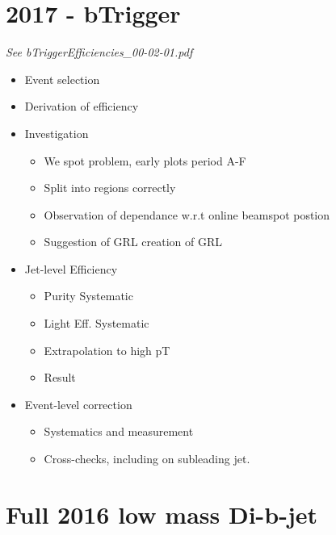 \section{2017 - bTrigger}
\textit{See bTriggerEfficiencies\_00-02-01.pdf}
\begin{itemize}
\item{Event selection}
\item{Derivation of efficiency}
\item{Investigation}
  \begin{itemize}[label={$-$}]
  \item{We spot problem, early plots period A-F}
  \item{Split into regions correctly}
  \item{Observation of dependance w.r.t online beamspot postion}
  \item{Suggestion of GRL creation of GRL}
  \end{itemize}
\item{Jet-level Efficiency}
  \begin{itemize}[label={$-$}]
  \item{Purity Systematic}
  \item{Light Eff. Systematic}
  \item{Extrapolation to high pT}
  \item{Result}
  \end{itemize}
\item{Event-level correction}
  \begin{itemize}[label={$-$}]
  \item{Systematics and measurement}
  \item{Cross-checks, including on subleading jet.}
  \end{itemize}
\end{itemize}

\section{Full 2016 low mass Di-b-jet}

